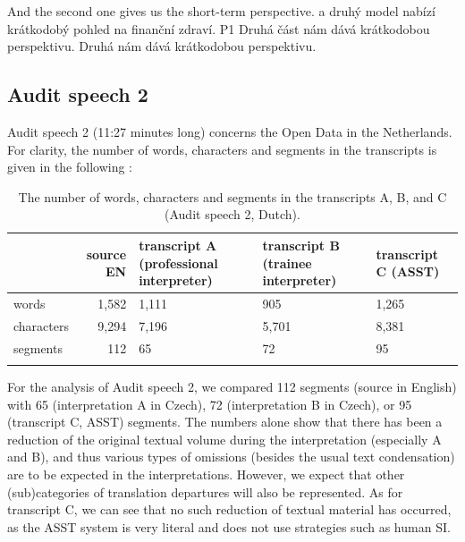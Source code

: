 \documentclass[output=paper]{langscibook}
\begin{document}
\ea
  \ea
    \ea  And the second one gives us the short-term perspective.
    \ex  a druhý model nabízí krátkodobý pohled na finanční zdraví.
    \ex  P1
    \z
  \ex
    \ea
    \ex  Druhá část nám dává krátkodobou perspektivu.
    \z
  \ex
    \ea
    \ex  Druhá nám dává krátkodobou perspektivu.
    \z
  \z


\z%
%
%


\subsection{Audit speech 2}\label{sec:kloudova:4.2}

Audit speech 2 (11:27 minutes long) concerns the Open Data in the Netherlands. For clarity, the number of words, characters and segments in the transcripts is given in the following :

\begin{table}
\begin{tabularx}{\textwidth}{lrYYY}
\lsptoprule
 & source EN & transcript A (professional interpreter) & transcript B (trainee interpreter) & transcript C (ASST)\\
\midrule
words & 1,582 & 1,111 & 905 & 1,265\\
characters & 9,294 & 7,196 & 5,701 & 8,381\\
segments & 112 & 65 & 72 & 95\\
\lspbottomrule
\end{tabularx}

\caption{The number of words, characters and segments in the transcripts A, B, and C (Audit speech 2, Dutch).}
\label{tab:kloudova:6}
\end{table}

For the analysis of Audit speech 2, we compared 112 segments (source in English) with 65 (interpretation A in Czech), 72 (interpretation B in Czech), or 95 (transcript C, ASST) segments. The numbers alone show that there has been a reduction of the original textual volume during the interpretation (especially A and B), and thus various types of omissions (besides the usual text condensation) are to be expected in the interpretations. However, we expect that other (sub)categories of translation departures will also be represented. As for transcript C, we can see that no such reduction of textual material has occurred, as the ASST system is very literal and does not use strategies such as human SI.
\end{document}
